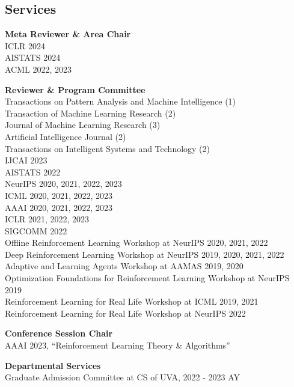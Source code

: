 \documentclass[margin, 10pt]{res} %
\newcommand*{\universityservices}{}
\begin{document}
\begin{resume}
\section{Services}
{\textbf{Meta Reviewer \& Area Chair}} \\
ICLR 2024 \\
AISTATS 2024 \\
ACML 2022, 2023


{\textbf{Reviewer \& Program Committee}} \\
Transactions on Pattern Analysis and Machine Intelligence (1) \\
Transaction of Machine Learning Research (2) \\
Journal of Machine Learning Research (3) \\
Artificial Intelligence Journal (2) \\
Transactions on Intelligent Systems and Technology (2) \\
IJCAI 2023 \\
AISTATS 2022 \\
NeurIPS 2020, 2021, 2022, 2023 \\
ICML 2020, 2021, 2022, 2023 \\
AAAI 2020, 2021, 2022, 2023 \\
ICLR 2021, 2022, 2023 \\
SIGCOMM 2022\\
Offline Reinforcement Learning Workshop at NeurIPS 2020, 2021, 2022 \\
Deep Reinforcement Learning Workshop at NeurIPS 2019, 2020, 2021, 2022 \\
Adaptive and Learning Agents Workshop at AAMAS 2019, 2020 \\
Optimization Foundations for Reinforcement Learning Workshop at NeurIPS 2019 \\
Reinforcement Learning for Real Life Workshop at ICML 2019, 2021 \\
Reinforcement Learning for Real Life Workshop at NeurIPS 2022

{\textbf{Conference Session Chair}} \\
AAAI 2023, ``Reinforcement Learning Theory \& Algorithms''

\ifdefined\universityservices
\textbf{Departmental Services} \\
Graduate Admission Committee at CS of UVA, 2022 - 2023 AY
\fi


\end{resume}
\end{document}
